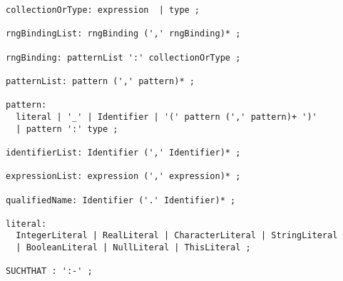{\begin{verbatim}
collectionOrType: expression  | type ;

rngBindingList: rngBinding (',' rngBinding)* ;

rngBinding: patternList ':' collectionOrType ;

patternList: pattern (',' pattern)* ;

pattern:
  literal | '_' | Identifier | '(' pattern (',' pattern)+ ')'
  | pattern ':' type ;
  
identifierList: Identifier (',' Identifier)* ;

expressionList: expression (',' expression)* ;
    
qualifiedName: Identifier ('.' Identifier)* ;

literal:
  IntegerLiteral | RealLiteral | CharacterLiteral | StringLiteral
  | BooleanLiteral | NullLiteral | ThisLiteral ;

SUCHTHAT : ':-' ;

\end{verbatim}
}

